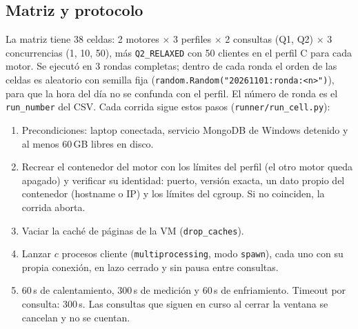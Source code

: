 \documentclass[11pt,a4paper]{article}
\newcommand{\cod}[1]{\texttt{#1}}
\begin{document}
\subsection{Matriz y protocolo}
La matriz tiene 38 celdas: 2 motores $\times$ 3 perfiles $\times$ 2 consultas (Q1, Q2)
$\times$ 3 concurrencias (1, 10, 50), más \cod{Q2\_RELAXED} con 50 clientes en el
perfil C para cada motor. Se ejecutó en 3 rondas completas; dentro de cada ronda el orden
de las celdas es aleatorio con semilla fija (\cod{random.Random("20261101:ronda:<n>")}),
para que la hora del día no se confunda con el perfil. El número de ronda es el
\cod{run\_number} del CSV. Cada corrida sigue estos pasos (\cod{runner/run\_cell.py}):
\begin{enumerate}
\item Precondiciones: laptop conectada, servicio MongoDB de Windows detenido y al menos
  60\,GB libres en disco.
\item Recrear el contenedor del motor con los límites del perfil (el otro motor queda
  apagado) y verificar su identidad: puerto, versión exacta, un dato propio del
  contenedor (hostname o IP) y los límites del cgroup. Si no coinciden, la corrida aborta.
\item Vaciar la caché de páginas de la VM (\cod{drop\_caches}).
\item Lanzar $c$ procesos cliente (\cod{multiprocessing}, modo \cod{spawn}), cada uno con
  su propia conexión, en lazo cerrado y sin pausa entre consultas.
\item 60\,s de calentamiento, 300\,s de medición y 60\,s de enfriamiento. Timeout por
  consulta: 300\,s. Las consultas que siguen en curso al cerrar la ventana se cancelan y
  no se cuentan.
\end{enumerate}
\end{document}
